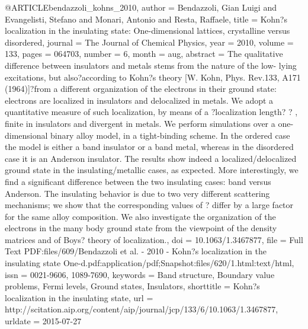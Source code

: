 @ARTICLE{bendazzoli_kohns_2010,
  author = {Bendazzoli, Gian Luigi and Evangelisti, Stefano and Monari, Antonio
	and Resta, Raffaele},
  title = {Kohn?s localization in the insulating state: {One}-dimensional lattices,
	crystalline versus disordered},
  journal = {The Journal of Chemical Physics},
  year = {2010},
  volume = {133},
  pages = {064703},
  number = {6},
  month = aug,
  abstract = {The qualitative difference between insulators and metals stems from
	the nature of the low- lying excitations, but also?according to Kohn?s
	theory [W. Kohn, Phys. Rev.133, A171 (1964)]?from a different organization
	of the electrons in their ground state: electrons are localized in
	insulators and delocalized in metals. We adopt a quantitative measure
	of such localization, by means of a ?localization length? ? , finite
	in insulators and divergent in metals. We perform simulations over
	a one-dimensional binary alloy model, in a tight-binding scheme.
	In the ordered case the model is either a band insulator or a band
	metal, whereas in the disordered case it is an Anderson insulator.
	The results show indeed a localized/delocalized ground state in the
	insulating/metallic cases, as expected. More interestingly, we find
	a significant difference between the two insulating cases: band versus
	Anderson. The insulating behavior is due to two very different scattering
	mechanisms; we show that the corresponding values of ? differ by
	a large factor for the same alloy composition. We also investigate
	the organization of the electrons in the many body ground state from
	the viewpoint of the density matrices and of Boys? theory of localization.},
  doi = {10.1063/1.3467877},
  file = {Full Text PDF:files/609/Bendazzoli et al. - 2010 - Kohn?s localization in the insulating state   One-d.pdf:application/pdf;Snapshot:files/620/1.html:text/html},
  issn = {0021-9606, 1089-7690},
  keywords = {Band structure, Boundary value problems, Fermi levels, Ground states,
	Insulators},
  shorttitle = {Kohn?s localization in the insulating state},
  url = {http://scitation.aip.org/content/aip/journal/jcp/133/6/10.1063/1.3467877},
  urldate = {2015-07-27}
}

